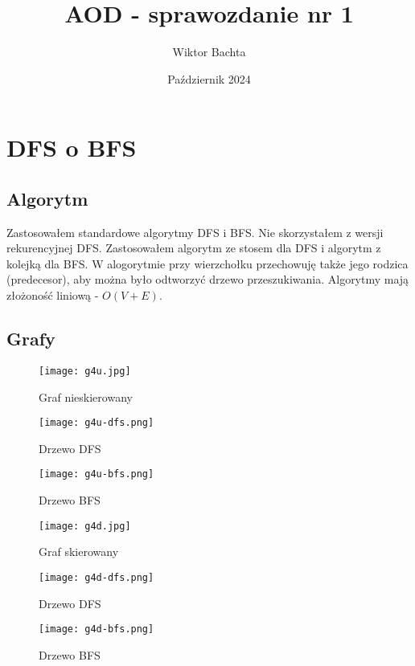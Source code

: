 \documentclass[12pt, letterpaper]{article}
\title{AOD - sprawozdanie nr 1}
\author{Wiktor Bachta}
\date{Październik 2024}
\begin{document}
\maketitle

\section{DFS o BFS}

\subsection{Algorytm}

Zastosowałem standardowe algorytmy DFS i BFS. Nie skorzystałem
z wersji rekurencyjnej DFS. Zastosowałem algorytm ze stosem dla DFS
i algorytm z kolejką dla BFS. W alogorytmie przy wierzchołku przechowuję
także jego rodzica (predecesor), aby można było odtworzyć drzewo
przeszukiwania. Algorytmy mają złożoność liniową - $O(V + E)$.

\subsection{Grafy}

\begin{figure}[H]
    \centering
    \texttt{[image: g4u.jpg]}
    \caption{Graf nieskierowany}
\end{figure}

\begin{figure}[H]
    \centering
    \texttt{[image: g4u-dfs.png]}
    \caption{Drzewo DFS}
\end{figure}

\begin{figure}[H]
    \centering
    \texttt{[image: g4u-bfs.png]}
    \caption{Drzewo BFS}
\end{figure}

\begin{figure}[H]
    \centering
    \texttt{[image: g4d.jpg]}
    \caption{Graf skierowany}
\end{figure}

\begin{figure}[H]
    \centering
    \texttt{[image: g4d-dfs.png]}
    \caption{Drzewo DFS}
\end{figure}

\begin{figure}[H]
    \centering
    \texttt{[image: g4d-bfs.png]}
    \caption{Drzewo BFS}
\end{figure}
\end{document}
